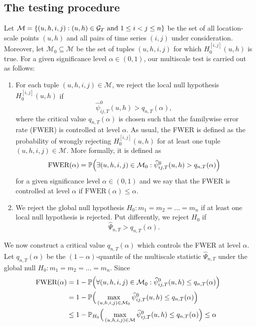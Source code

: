 \documentclass[a4paper,12pt]{article}
\begin{document}
\subsection{The testing procedure}\label{subsec:test:test}


Let $\mathcal{M} = \{ (u,h,i,j): (u,h) \in \mathcal{G}_T \text{ and } 1 \le i < j \le n \}$ be the set of all location-scale points $(u,h)$ and all pairs of time series $(i,j)$ under consideration. Moreover, let $\mathcal{M}_0 \subseteq \mathcal{M}$ be the set of tuples $(u,h,i,j)$ for which $H_0^{[i, j]}(u, h)$ is true.
For a given significance level $\alpha \in (0,1)$, our multiscale test is carried out as follows: 
\begin{enumerate}[label=(\roman*),leftmargin=0.75cm]

\item For each tuple $(u,h,i,j) \in \mathcal{M}$, we reject the local null hypothesis $H_0^{[i, j]}(u, h)$ if 
\[ \widehat{\psi}^0_{ij, T}(u, h) > q_{n,T}(\alpha), \]
where the critical value $q_{n,T}(\alpha)$ is chosen such that the familywise error rate (FWER) is controlled at level $\alpha$. As usual, the FWER is defined as the probability of wrongly rejecting $H_0^{[i, j]}(u, h)$ for at least one tuple $(u,h,i,j) \in \mathcal{M}$. More formally, it is defined as 
\[ \text{FWER}(\alpha) = \mathbb{P} \Big( \exists (u,h,i,j) \in \mathcal{M}_0 : \widehat{\psi}^0_{ij, T}(u, h) > q_{n,T}(\alpha) \Big) \]
for a given significance level $\alpha \in (0,1)$ and we say that the FWER is controlled at level $\alpha$ if $\text{FWER}(\alpha) \le \alpha$.

\item We reject the global null hypothesis $H_0: m_1 = m_2 = \ldots = m_n$ if at least one local null hypothesis is rejected. Put differently, we reject $H_0$ if 
\[ \widehat{\Psi}_{n,T} > q_{n,T}(\alpha). \]
\end{enumerate}
We now construct a critical value $q_{n,T}(\alpha)$ which controls the FWER at level $\alpha$. Let $q_{n,T}(\alpha)$ be the $(1-\alpha)$-quantile of the multiscale statistic $\widehat{\Psi}_{n,T}$ under the global null $H_0: m_1 = m_2 = \ldots = m_n$. Since
\begin{align*} 
\text{FWER}(\alpha)
 & = 1 - \mathbb{P} \Big( \forall (u,h,i,j) \in \mathcal{M}_0 : \widehat{\psi}^0_{ij, T}(u, h) \le q_{n,T}(\alpha) \Big) \\
 & = 1 - \mathbb{P} \Big( \max_{ (u,h,i,j) \in \mathcal{M}_0} \widehat{\psi}^0_{ij, T}(u, h) \le q_{n,T}(\alpha) \Big) \\
 & \le 1 - \mathbb{P}_{H_0} \Big( \max_{ (u,h,i,j) \in \mathcal{M}} \widehat{\psi}^0_{ij, T}(u, h) \le q_{n,T}(\alpha) \Big) \le \alpha 
\end{align*}
\end{document}
